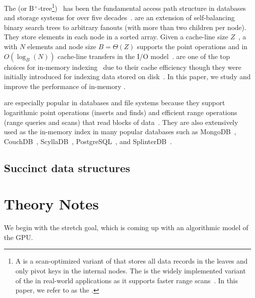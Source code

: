 The \btree(or B$^+$-tree\footnote{A \bplustree is a scan-optimized variant of
\btrees that stores all data records in the leaves and only pivot keys in the
internal nodes. The \bplustree is the widely implemented variant of the \btree
in real-world applications as it supports faster range
scans~\cite{mongodb,couchdb,scylladb,conway2020splinterdb,postgresql}. In this
paper, we refer to \bplustree as the \btree.})~\cite{BayerMc72} has been the
fundamental access path structure in databases and storage systems for over five
decades~\cite{Comer79,graefe2010survey}. \btrees are an extension of
self-balancing binary search trees to arbitrary fanouts (with more than two
children per node). They store elements in each node in a sorted array.  Given a
cache-line size $Z$~\cite{AggarwalVi88}, a \btree with $N$ elements and node
size $B = \Theta(Z)$ supports the point operations  and 
in $O(\log_B(N))$ cache-line transfers in the I/O model~\cite{AggarwalVi88}.
\btrees are one of the top choices for in-memory indexing~\cite{ZhangChOo15} due
to their cache efficiency though they were initially introduced for indexing
data stored on disk~\cite{BayerMc72}. In this paper, we study and improve the
performance of in-memory \btrees.

\btrees are especially popular in databases and file systems because they
support logarithmic point operations (inserts and finds) and efficient range
operations (range queries and scans) that read blocks of
data~\cite{Knuth98,rodeh2013btrfs}.  They are also extensively used as the
in-memory index in many popular databases such as MongoDB~\cite{mongodb},
CouchDB~\cite{couchdb}, ScyllaDB~\cite{scylladb}, PostgreSQL~\cite{postgresql},
and SplinterDB~\cite{conway2020splinterdb}.

\subsection{Succinct data structures}

\section{Theory Notes}


We begin with the stretch goal, which is coming up with an algorithmic model of the GPU.

